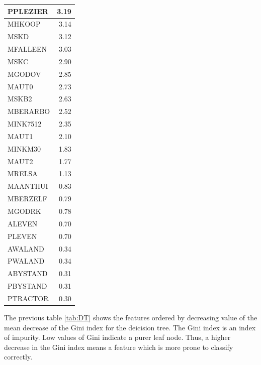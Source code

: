 \documentclass[
  12pt,
  oneside]{report}
\begin{document}
\begin{table}[H]
\begin{tabular}[t]{l|r}
\hline
PPLEZIER & 3.19\\
\hline
MHKOOP & 3.14\\
\hline
MSKD & 3.12\\
\hline
MFALLEEN & 3.03\\
\hline
MSKC & 2.90\\
\hline
MGODOV & 2.85\\
\hline
MAUT0 & 2.73\\
\hline
MSKB2 & 2.63\\
\hline
MBERARBO & 2.52\\
\hline
MINK7512 & 2.35\\
\hline
MAUT1 & 2.10\\
\hline
MINKM30 & 1.83\\
\hline
MAUT2 & 1.77\\
\hline
MRELSA & 1.13\\
\hline
MAANTHUI & 0.83\\
\hline
MBERZELF & 0.79\\
\hline
MGODRK & 0.78\\
\hline
ALEVEN & 0.70\\
\hline
PLEVEN & 0.70\\
\hline
AWALAND & 0.34\\
\hline
PWALAND & 0.34\\
\hline
ABYSTAND & 0.31\\
\hline
PBYSTAND & 0.31\\
\hline
PTRACTOR & 0.30\\
\hline
\end{tabular}
\end{table}

The previous table \ref{tab:DT} shows the features ordered by decreasing value of the mean decrease of the Gini index for the deicision tree. The Gini index is an index of impurity. Low values of Gini indicate a purer leaf node. Thus, a higher decrease in the Gini index means a feature which is more prone to classify correctly.
\end{document}
